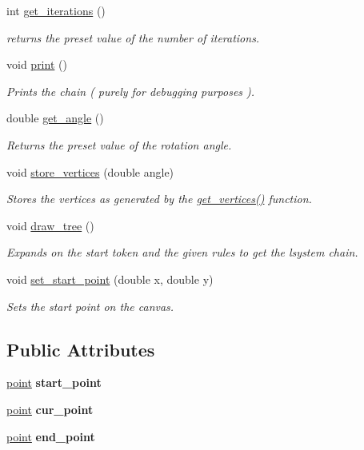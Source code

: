\begin{DoxyCompactItemize}
$$int \hyperlink{classlsystem_a3e01f9aa5993a3bc4e742de38c115c6c}{get\+\_\+iterations} ()
\begin{DoxyCompactList}\small\item\em returns the preset value of the number of iterations. \end{DoxyCompactList}\item 
void \hyperlink{classlsystem_a1f347088c28da045042bed115d0124bd}{print} ()
\begin{DoxyCompactList}\small\item\em Prints the chain ( purely for debugging purposes ). \end{DoxyCompactList}\item 
double \hyperlink{classlsystem_a50da66459afeaf0dccd74d7da22fc491}{get\+\_\+angle} ()
\begin{DoxyCompactList}\small\item\em Returns the preset value of the rotation angle. \end{DoxyCompactList}\item 
void \hyperlink{classlsystem_afae86314472d289ed31a72bfb5fb4497}{store\+\_\+vertices} (double angle)
\begin{DoxyCompactList}\small\item\em Stores the vertices as generated by the \hyperlink{classlsystem_a21ea351c7dde6c0f7e708f2a2f341688}{get\+\_\+vertices()} function. \end{DoxyCompactList}\item 
void \hyperlink{classlsystem_ac16fc720993e9fdb28bc9613a975fca9}{draw\+\_\+tree} ()
\begin{DoxyCompactList}\small\item\em Expands on the start token and the given rules to get the lsystem chain. \end{DoxyCompactList}\item 
void \hyperlink{classlsystem_a8cc22353ac642e18e51168c891325330}{set\+\_\+start\+\_\+point} (double x, double y)
\begin{DoxyCompactList}\small\item\em Sets the start point on the canvas. \end{DoxyCompactList}\end{DoxyCompactItemize}
\subsection*{Public Attributes}
\begin{DoxyCompactItemize}
\item 
\mbox{\label{classlsystem_ab8987c3bc84c8bb63cb6db669637bf8f}} 
\hyperlink{classpoint}{point} {\bfseries start\+\_\+point}
\item 
\mbox{\label{classlsystem_a66bf9984a5215121ff740462f922102b}} 
\hyperlink{classpoint}{point} {\bfseries cur\+\_\+point}
\item 
\mbox{\label{classlsystem_a5b44bb56a8b67d5f4509f3d52e1b320d}} 
\hyperlink{classpoint}{point} {\bfseries end\+\_\+point}
\end{DoxyCompactItemize}


